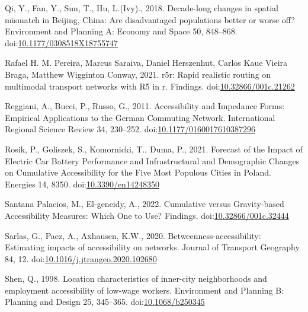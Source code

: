 \documentclass[]{elsarticle} %
\newlength{\cslhangindent}
\newlength{\cslentryspacingunit} %
\newenvironment{CSLReferences}[2] %
 {%
  \setlength{\parindent}{0pt}
  \ifodd #1
  \let\oldpar\par
  \def\par{\hangindent=\cslhangindent\oldpar}
  \fi
  \setlength{\parskip}{#2\cslentryspacingunit}
 }%
 {}
\begin{document}
\begin{CSLReferences}{1}{0}
\leavevmode{}%
Qi, Y., Fan, Y., Sun, T., Hu, L.(Ivy)., 2018. Decade-long changes in
spatial mismatch in {Beijing}, {China}: {Are} disadvantaged populations
better or worse off? Environment and Planning A: Economy and Space 50,
848--868.
doi:\href{https://doi.org/10.1177/0308518X18755747}{10.1177/0308518X18755747}

\leavevmode{}%
Rafael H. M. Pereira, Marcus Saraiva, Daniel Herszenhut, Carlos Kaue
Vieira Braga, Matthew Wigginton Conway, 2021. r5r: Rapid realistic
routing on multimodal transport networks with R5 in r. Findings.
doi:\href{https://doi.org/10.32866/001c.21262}{10.32866/001c.21262}

\leavevmode{}%
Reggiani, A., Bucci, P., Russo, G., 2011. Accessibility and {Impedance}
{Forms}: {Empirical} {Applications} to the {German} {Commuting}
{Network}. International Regional Science Review 34, 230--252.
doi:\href{https://doi.org/10.1177/0160017610387296}{10.1177/0160017610387296}

\leavevmode{}%
Rosik, P., Goliszek, S., Komornicki, T., Duma, P., 2021. Forecast of the
{Impact} of {Electric} {Car} {Battery} {Performance} and
{Infrastructural} and {Demographic} {Changes} on {Cumulative}
{Accessibility} for the {Five} {Most} {Populous} {Cities} in {Poland}.
Energies 14, 8350.
doi:\href{https://doi.org/10.3390/en14248350}{10.3390/en14248350}

\leavevmode{}%
Santana Palacios, M., El-geneidy, A., 2022. Cumulative versus
Gravity-based Accessibility Measures: Which One to Use? Findings.
doi:\href{https://doi.org/10.32866/001c.32444}{10.32866/001c.32444}

\leavevmode{}%
Sarlas, G., Paez, A., Axhausen, K.W., 2020. Betweenness-accessibility:
Estimating impacts of accessibility on networks. Journal of Transport
Geography 84, 12.
doi:\href{https://doi.org/10.1016/j.jtrangeo.2020.102680}{10.1016/j.jtrangeo.2020.102680}

\leavevmode{}%
Shen, Q., 1998. Location characteristics of inner-city neighborhoods and
employment accessibility of low-wage workers. Environment and Planning
B: Planning and Design 25, 345--365.
doi:\href{https://doi.org/10.1068/b250345}{10.1068/b250345}


\end{CSLReferences}
\end{document}
